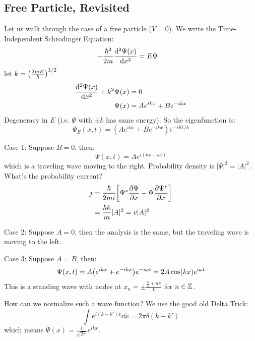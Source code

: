 \subsection{Free Particle, Revisited}
Let us walk through the case of a free particle ($V = 0$). We write the Time-Independent Schrodinger Equation:
\begin{align*}
    -\frac{\hbar^2}{2m} \derivative{^2 \Psi(x)}{x^2} &= E\Psi
\end{align*}
let $k = \qty(\frac{2mE}{\hbar})^{1/2}$
\begin{align*}
    \derivative{^2 \Psi(x)}{x^2} + k^2 \Psi(x) &= 0 \\
    \Psi(x) &= Ae^{ikx} + Be^{-ikx}
\end{align*}
Degeneracy in $E$ (i.e. $\Psi$ with $\pm k$ has same energy). So the eigenfunction is:
\[ \Psi_E(x, t) = (Ae^{ikx} + Be^{-ikx}) e^{-iEt/\hbar} \]

Case 1:
Suppose $B = 0$, then:
\[ \Psi(x, t) = Ae^{i(kx - \omega t)} \]
which is a traveling wave moving to the right. Probability density is $|\Psi|^2 = |A|^2$. What's the probability current?
\begin{align*}
    j &= \frac{\hbar}{2mi} \qty[\Psi^* \partialderivative{\Psi}{x} - \Psi \partialderivative{\Psi^*}{x}] \\
    &= \frac{\hbar k}{m} |A|^2 = v |A|^2
\end{align*}

Case 2:
Suppose $A = 0$, then the analysis is the same, but the traveling wave is moving to the left.

Case 3:
Suppose $A = B$, then:
\[ \Psi(x, t) = A\qty(e^{ikx} + e^{-ikx})e^{-i\omega t} = 2A \cos(kx) e^{i\omega t} \]
This is a standing wave with nodes at $x_n = \pm \frac{\frac{\pi}{2} + n \pi}{k}$ for $n \in \operatorname{\mathbb{Z}}$.

How can we normalize such a wave function? We use the good old Delta Trick:
\[ \int e^{i(k - k')x} \dd{x} = 2\pi \delta(k -k') \]
which means $\Psi(x) = \frac{1}{\sqrt{2\pi}} e^{ikx}$.
